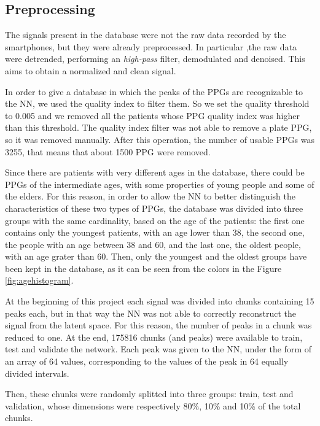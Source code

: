 \documentclass[12pt,a4paper,twocolumn]{article}
\begin{document}
			\subsection{Preprocessing}
				The signals present in the database were not the raw data recorded by the smartphones, but they were already preprocessed. In particular ,the raw data were detrended, performing an \emph{high-pass} filter, demodulated and denoised. This aims to obtain a normalized and clean signal.

				In order to give a database in which the peaks of the PPGs are recognizable to the NN, we used the quality index to filter them. So we set the quality threshold to 0.005 and we removed all the patients whose PPG quality index was higher than this threshold. The quality index filter was not able to remove a plate PPG, so it was removed manually. After this operation, the number of usable PPGs was 3255, that means that about 1500 PPG were removed.
				
				Since there are patients with very different ages in the database, there could be PPGs of the intermediate ages, with some properties of young people and some of the elders. For this reason, in order to allow the NN to better distinguish the characteristics of these two types of PPGs, the database was divided into three  groups with the same cardinality, based on the age of the patients: the first one contains only the youngest patients, with an age lower than 38, the second one, the people with an age between 38 and 60, and the last one, the oldest people, with an age grater than 60. Then, only the youngest and the oldest groups have been kept in the database, as it can be seen from the colors in the Figure \ref{fig:agehistogram}. 
				
				At the beginning of this project each signal was divided into chunks containing 15 peaks each, but in that way the NN was not able to correctly reconstruct the signal from the latent space. For this reason, the number of peaks in a chunk was reduced to one. At the end, 175816 chunks (and peaks) were available to train, test and validate the network. Each peak was given to the NN, under the form of an array of 64 values, corresponding to the values of the peak in 64 equally divided intervals.
				
				Then, these chunks were randomly splitted into three groups: train, test and validation, whose dimensions were respectively 80\%, 10\% and 10\% of the total chunks.
		
\end{document}
